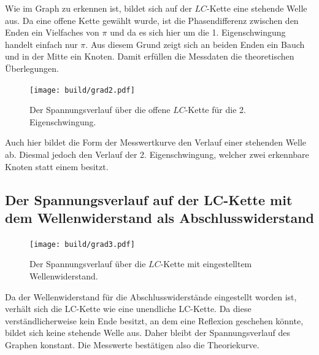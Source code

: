 \hspace{1.8ex} Wie im Graph zu erkennen ist, bildet sich auf der $LC$-Kette eine stehende Welle aus.
 Da eine offene Kette gewählt wurde, ist die Phasendifferenz zwischen den Enden ein Vielfaches
  von $\pi$ und da es sich hier um die 1. Eigenschwingung handelt einfach nur $\pi$. Aus diesem Grund zeigt
 sich an beiden Enden ein Bauch und in der Mitte ein Knoten. Damit erfüllen die Messdaten die theoretischen Überlegungen.
\begin{figure}[H]
	\centering
	\caption{Der Spannungsverlauf über die offene $LC$-Kette für die 2. Eigenschwingung.}
	\texttt{[image: build/grad2.pdf]}
	\label{fig:grad2}
\end{figure}
Auch hier bildet die Form der Messwertkurve den Verlauf einer stehenden Welle ab. Diesmal jedoch den Verlauf der 2. Eigenschwingung, welcher zwei erkennbare Knoten statt einem besitzt.

\subsection{Der Spannungsverlauf auf der LC-Kette mit dem Wellenwiderstand als Abschlusswiderstand}
\begin{figure}[H]
	\centering
	\caption{Der Spannungsverlauf über die $LC$-Kette mit eingestelltem Wellenwiderstand.}
	\texttt{[image: build/grad3.pdf]}
	\label{fig:grad3}
\end{figure}

Da der Wellenwiderstand für die Abschlusswiderstände eingestellt worden ist,
verhält sich die LC-Kette wie eine unendliche LC-Kette. Da diese verständlicherweise
 kein Ende besitzt, an dem eine Reflexion geschehen könnte, bildet sich keine stehende Welle aus.
  Daher bleibt der Spannungsverlauf des Graphen konstant. Die Messwerte
   bestätigen also die Theoriekurve.
